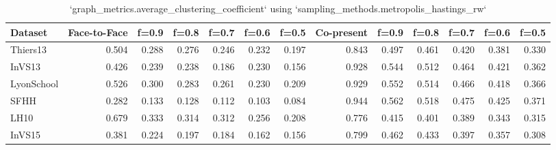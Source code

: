 \begin{table}[ht]
\begin{tabular}{lrrrrrrrrrrrr}
\hline
 Dataset    &   Face-to-Face &   f=0.9 &   f=0.8 &   f=0.7 &   f=0.6 &   f=0.5 &   Co-present &   f=0.9 &   f=0.8 &   f=0.7 &   f=0.6 &   f=0.5 \\
\hline
 Thiers13   &          0.504 &   0.288 &   0.276 &   0.246 &   0.232 &   0.197 &        0.843 &   0.497 &   0.461 &   0.420 &   0.381 &   0.330 \\
 InVS13     &          0.426 &   0.239 &   0.238 &   0.186 &   0.230 &   0.156 &        0.928 &   0.544 &   0.512 &   0.464 &   0.421 &   0.362 \\
 LyonSchool &          0.526 &   0.300 &   0.283 &   0.261 &   0.230 &   0.209 &        0.929 &   0.552 &   0.514 &   0.466 &   0.418 &   0.366 \\
 SFHH       &          0.282 &   0.133 &   0.128 &   0.112 &   0.103 &   0.084 &        0.944 &   0.562 &   0.518 &   0.475 &   0.425 &   0.371 \\
 LH10       &          0.679 &   0.333 &   0.314 &   0.312 &   0.256 &   0.208 &        0.776 &   0.415 &   0.401 &   0.389 &   0.343 &   0.315 \\
 InVS15     &          0.381 &   0.224 &   0.197 &   0.184 &   0.162 &   0.156 &        0.799 &   0.462 &   0.433 &   0.397 &   0.357 &   0.308 \\
\hline
\end{tabular}
\caption{`graph_metrics.average_clustering_coefficient` using `sampling_methods.metropolis_hastings_rw`}
\end{table}